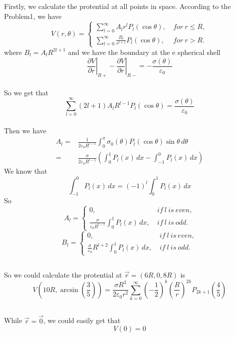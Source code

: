 \documentclass[10.5pt]{article}
\begin{document}
\section{}

\section{}
Firstly, we calculate the protential at all points in space. According to the Problem1, we have $$V(r,\theta) = \begin{cases}
    \sum_{l=0}^{\infty} A_l r^l P_l(\cos\theta), & ~for ~r\leqslant R,\\
    \sum_{l=0}^{\infty} \frac{B_l}{r^{l+1}} P_l(\cos\theta), & ~for ~r>R.
\end{cases}$$ where $B_l = A_lR^{2l+1}$ and we have the boundary at the e spherical shell $$\left.\frac{\partial V}{\partial r} \right\rvert_{R+}  - \left.\frac{\partial V}{\partial r}\right\rvert_{R-} = -\frac{\sigma (\theta)}{\varepsilon_0}$$\\\indent
So we get that $$\sum_{l=0}^{\infty} (2l+1)A_lR^{l-1}P_l(\cos\theta) = \frac{\sigma (\theta)}{\varepsilon_0}$$\\\indent
Then we have\begin{align*}
    A_l =&\frac{1}{2\varepsilon_0 R^{l-1}}\int_0^\pi \sigma_0(\theta)P_l(\cos\theta)\sin\theta \,d\theta\\
    =&\frac{\sigma}{2\varepsilon_0 R^{l-1}} \left(\int_0^1P_l(x) \,dx - \int_{-1}^0P_l(x) \,dx\right)
\end{align*}\indent
We know that $$\int_{-1}^0 P_l(x)\,dx = (-1)^l\int_0^1 P_l(x)\,dx$$\indent
So \large$$A_l = \begin{cases}
    0, & ~if ~l ~is ~even,\\
    \frac{\sigma }{\varepsilon_0 R^{l-1}}\int_0^1 P_l(x)\,dx, & ~if ~l ~is ~odd.
\end{cases}$$
$$B_l = \begin{cases}
    0, & ~if ~l ~is ~even,\\
    \frac{\sigma }{\varepsilon_0}R^{l+2}\int_0^1 P_l(x)\,dx, & ~if ~l ~is ~odd.
\end{cases}$$
\indent\normalsize
\subsection{}
So we could calculate the protential at $\vec{r} = (6R,0,8R)$ is $$V\left(10R,\arcsin\left(\frac{3}{5}\right)\right) = \frac{\sigma R^3}{2\varepsilon_0 r^2} \sum_{k=0}^{\infty} \left(-\frac{1}{2}\right)^k \left(\frac{R}{r}\right)^{2k} P_{2k+1}\left(\frac{4}{5}\right)$$
\subsection{}
While $\vec{r} = \vec{0}$, we could easily get that $$V(0) = 0$$
\end{document}

